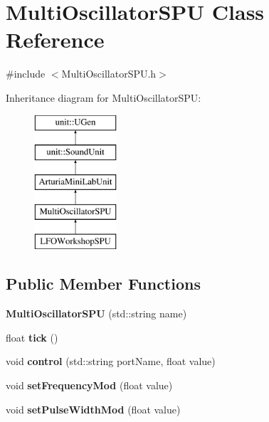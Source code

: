 \hypertarget{classMultiOscillatorSPU}{}\section{Multi\+Oscillator\+S\+PU Class Reference}
\label{classMultiOscillatorSPU}


{\ttfamily \#include $<$Multi\+Oscillator\+S\+P\+U.\+h$>$}

Inheritance diagram for Multi\+Oscillator\+S\+PU\+:\begin{figure}[H]
\begin{center}
\leavevmode
\includegraphics[height=5.000000cm]{classMultiOscillatorSPU}
\end{center}
\end{figure}
\subsection*{Public Member Functions}
\begin{DoxyCompactItemize}
\item 
{\bfseries Multi\+Oscillator\+S\+PU} (std\+::string name)\hypertarget{classMultiOscillatorSPU_a3c7fc8e1067fb1b025551702344597a6}{}\label{classMultiOscillatorSPU_a3c7fc8e1067fb1b025551702344597a6}

\item 
float {\bfseries tick} ()\hypertarget{classMultiOscillatorSPU_ac5004f7b5bfa6025abee24b53abdd69f}{}\label{classMultiOscillatorSPU_ac5004f7b5bfa6025abee24b53abdd69f}

\item 
void {\bfseries control} (std\+::string port\+Name, float value)\hypertarget{classMultiOscillatorSPU_ab20794e0a79b779f35b36582cf4f65d0}{}\label{classMultiOscillatorSPU_ab20794e0a79b779f35b36582cf4f65d0}

\item 
void {\bfseries set\+Frequency\+Mod} (float value)\hypertarget{classMultiOscillatorSPU_a7040cf4388fe9bdaf624b707973241d0}{}\label{classMultiOscillatorSPU_a7040cf4388fe9bdaf624b707973241d0}

\item 
void {\bfseries set\+Pulse\+Width\+Mod} (float value)\hypertarget{classMultiOscillatorSPU_a42f7950c4fac230d97f43fa22587064e}{}\label{classMultiOscillatorSPU_a42f7950c4fac230d97f43fa22587064e}

\end{DoxyCompactItemize}
